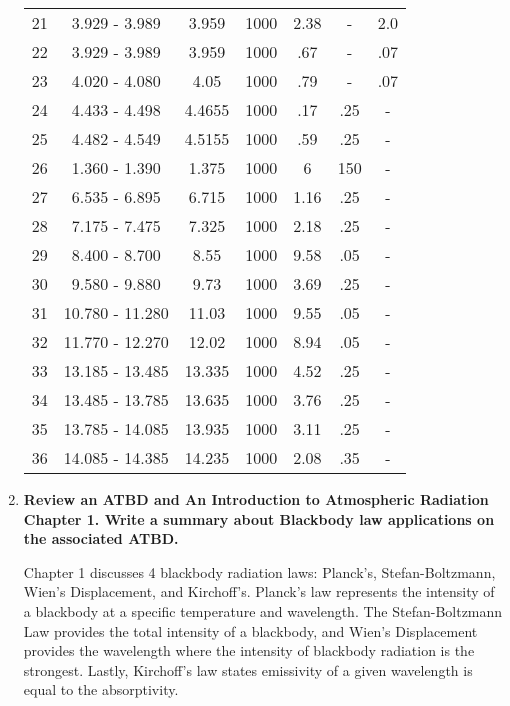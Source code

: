 \documentclass[12pt, letterpaper]{article}
\begin{document}
\begin{enumerate}
\begin{center}
{\begin{tabular}{| c | c | c | c | c | c | c | }
        21 & 3.929 - 3.989 & 3.959 & 1000 & 2.38 & - & 2.0 \\
        22 & 3.929 - 3.989 & 3.959 & 1000 & .67 & - & .07 \\
        23 & 4.020 - 4.080 & 4.05 & 1000 & .79 & - & .07 \\
        24 & 4.433 - 4.498 & 4.4655 & 1000 & .17 & .25 & - \\
        25 & 4.482 - 4.549 & 4.5155 & 1000 & .59 & .25 & - \\
        \hline
        26 & 1.360 - 1.390 & 1.375 & 1000 & 6 & 150 & - \\
        \hline
        27 & 6.535 - 6.895 & 6.715 & 1000 & 1.16 & .25 & - \\
        28 & 7.175 - 7.475 & 7.325 & 1000 & 2.18 & .25 & - \\
        29 & 8.400 - 8.700 & 8.55 & 1000 & 9.58 & .05 & - \\
        \hline
        30 & 9.580 - 9.880 & 9.73 & 1000 & 3.69 & .25 & - \\
        \hline
        31 & 10.780 - 11.280 & 11.03 & 1000 & 9.55 & .05 & - \\
        32 & 11.770 - 12.270 & 12.02 & 1000 & 8.94 & .05 & - \\
        33 & 13.185 - 13.485 & 13.335 & 1000 & 4.52 & .25 & - \\
        34 & 13.485 - 13.785 & 13.635 & 1000 & 3.76 & .25 & - \\
        35 & 13.785 - 14.085 & 13.935 & 1000 & 3.11 & .25 & - \\
        36 & 14.085 - 14.385 & 14.235 & 1000 & 2.08 & .35 & - \\
        \hline
    \end{tabular}
    } %
\end{center}
    \pagebreak
    \item \textbf{Review an ATBD and An Introduction to Atmospheric Radiation Chapter 1. Write a summary about Blackbody law applications on the associated ATBD.}
    
    Chapter 1 discusses 4 blackbody radiation laws: Planck's, Stefan-Boltzmann, Wien's Displacement, and Kirchoff's. Planck's law represents the intensity of a blackbody at a specific temperature and wavelength. The Stefan-Boltzmann Law provides the total intensity of a blackbody, and Wien's Displacement provides the wavelength where the intensity of blackbody radiation is the strongest. Lastly, Kirchoff's law states emissivity of a given wavelength is equal to the absorptivity. 


\end{enumerate}
\end{document}
